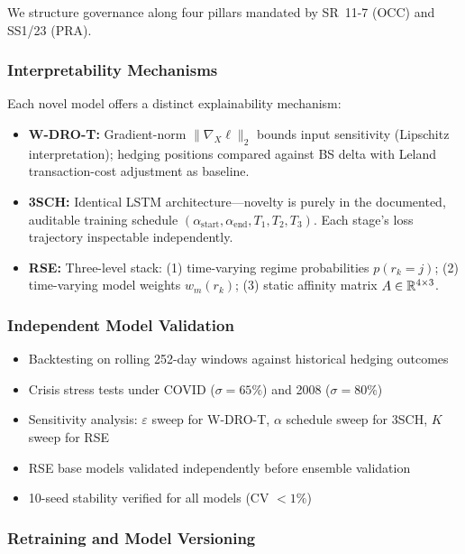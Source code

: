 We structure governance along four pillars mandated by SR~11-7 (OCC) and SS1/23 (PRA).

\subsubsection{Interpretability Mechanisms}

Each novel model offers a distinct explainability mechanism:
\begin{itemize}[noitemsep]
    \item \textbf{W-DRO-T:} Gradient-norm $\|\nabla_X\ell\|_2$ bounds input sensitivity (Lipschitz interpretation); hedging positions compared against BS delta with Leland transaction-cost adjustment as baseline.
    \item \textbf{3SCH:} Identical LSTM architecture---novelty is purely in the documented, auditable training schedule $(\alpha_{\text{start}}, \alpha_{\text{end}}, T_1, T_2, T_3)$. Each stage's loss trajectory inspectable independently.
    \item \textbf{RSE:} Three-level stack: (1) time-varying regime probabilities $p(r_k=j)$; (2) time-varying model weights $w_m(r_k)$; (3) static affinity matrix $A \in \mathbb{R}^{4 \times 3}$.
\end{itemize}

\subsubsection{Independent Model Validation}

\begin{itemize}[noitemsep]
    \item Backtesting on rolling 252-day windows against historical hedging outcomes
    \item Crisis stress tests under COVID ($\sigma=65\%$) and 2008 ($\sigma=80\%$)
    \item Sensitivity analysis: $\varepsilon$ sweep for W-DRO-T, $\alpha$ schedule sweep for 3SCH, $K$ sweep for RSE
    \item RSE base models validated independently before ensemble validation
    \item 10-seed stability verified for all models (CV $< 1\%$)
\end{itemize}

\subsubsection{Retraining and Model Versioning}

